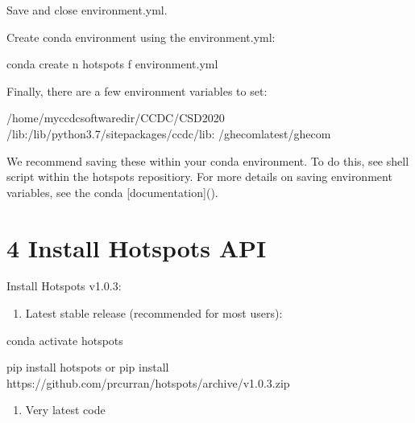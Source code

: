 \documentclass[letterpaper,10pt,english]{sphinxmanual}
\begin{document}
Save and close environment.yml.

Create conda environment using the environment.yml:

\begin{sphinxVerbatim}[commandchars=\\\{\}]
conda create \PYGZhy{}n hotspots \PYGZhy{}f environment.yml
\end{sphinxVerbatim}

Finally, there are a few environment variables to set:

\begin{sphinxVerbatim}[commandchars=\\\{\}]
\PYGZdl{}  /home/my\PYGZus{}ccdc\PYGZus{}software\PYGZus{}dir/CCDC/CSD\PYGZus{}2020
\PYGZdl{}  /lib:/lib/python3.7/site\PYGZhy{}packages/ccdc/\PYGZus{}lib:
\PYGZdl{}  /ghecom\PYGZus{}latest/ghecom
\end{sphinxVerbatim}

We recommend saving these within your conda environment. To do this, see  shell script within
the hotspots repositiory. For more details on saving environment variables, see the
conda {[}documentation{]}().


\section{4 Install Hotspots API}
\label{\detokenize{tutorial:install-hotspots-api}}
Install Hotspots v1.0.3:
\begin{enumerate}
%
\item {} 
Latest stable release (recommended for most users):

\end{enumerate}

\begin{sphinxVerbatim}[commandchars=\\\{\}]
conda activate hotspots

pip install hotspots
or
pip install https://github.com/prcurran/hotspots/archive/v1.0.3.zip
\end{sphinxVerbatim}
\begin{enumerate}
%
\setcounter{enumi}{1}
\item {} 
Very latest code

\end{enumerate}
\end{document}
